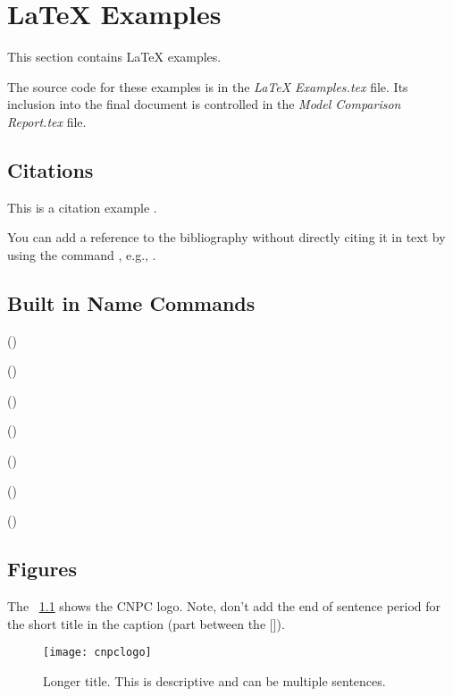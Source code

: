 \chapter{\LaTeX{} Examples}
This section contains \LaTeX{} examples.  

The source code for these examples is in the \textit{LaTeX Examples.tex} file.  Its inclusion into the final document is controlled in the \textit{Model Comparison Report.tex} file.

\section{Citations}
This is a citation example .
~\cite{ref:aarsnes2017a}

You can add a reference to the bibliography without directly citing it in text by using the command , e.g., .

\section{Built in Name Commands}
\begin{bulletedlist}
	\item {} ()
	\item \figurename{} ()
	\item \tablename{} ()
	\item \equationname{} ()
	\item \chaptername{} ()
	\item \appendixname{} ()
	\item \sectionname{} ()
\end{bulletedlist}

\section{Figures}
The \figurename~\ref{fig:cnpclogo} shows the CNPC logo.  Note, don't add the end of sentence period for the short title in the caption (part between the []).
\begin{figure}
	\centering
	\texttt{[image: cnpclogo]}
	\caption[Short title for list of figures]{Longer title.  This is descriptive and can be multiple sentences.}
	\label{fig:cnpclogo}
\end{figure}


